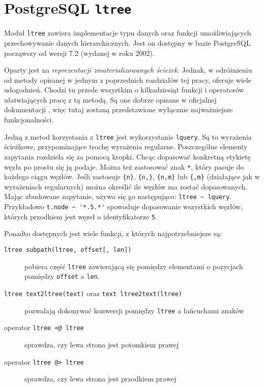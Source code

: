 \section{PostgreSQL \texttt{ltree}}



Moduł \texttt{ltree} zawiera implementacje typu danych oraz funkcji umożliwiających przechowywanie danych hierarchicznych.
Jest on dostępny w bazie PostgreSQL począwszy od wersji 7.2 (wydanej w roku 2002).

Oparty jest na \emph{reprezentacji zmaterializowanych ścieżek}.
Jednak, w odróżnieniu od metody opisanej w jednym z poprzednich rozdziałów tej pracy, oferuje wiele udogodnień.
Chodzi tu przede wszystkim o kilkadziesiąt funkcji i operatorów ułatwiających pracę z tą metodą.
Są one dobrze opisane w oficjalnej dokumentacji \cite{ltree}, 
więc tutaj zostaną przedstawione wyłącznie najważniejsze funkcjonalności.


Jedną z metod korzystania z \texttt{ltree} jest wykorzystanie \texttt{lquery}.
Są to wyrażenia ścieżkowe, przypominające trochę wyrażenia regularne.
Poszczególne elementy zapytania rozdziela się za pomocą kropki.
Chcąc dopasować konkretną etykietę węzła po prostu się ją podaje.
Można też zastosować znak \verb|*|, który pasuje do każdego ciągu węzłów.
Jeśli zastosuje \texttt{\{n\}}, \texttt{\{n,\}}, \texttt{\{n,m\}} lub \texttt{\{,m\}} 
(działające jak w wyrażeniach regularnych)
można określić ile węzłów ma zostać dopasowanych.
Mając zbudowane zapytanie, używa się go następująco: \verb|ltree ~ lquery|.
Przykładowo \verb|t.node ~ '*.5.*'| spowoduje dopasowanie wszystkich węzłów, 
których przodkiem jest węzeł o identyfikatorze \texttt{5}.


Ponadto dostępnych jest wiele funkcji, z których najpotrzebniejsze są:

\begin{description}
    \item[\texttt{ltree subpath(ltree, offset[, len])}]
    	pobiera część \texttt{ltree} zawierającą się pomiędzy elementami o pozycjach pomiędzy 
    	\texttt{offset} a \texttt{len}. 
    \item[\texttt{ltree text2ltree(text)} oraz \texttt{text ltree2text(ltree)}] 
    	pozwalają dokonywać konwersji pomiędzy \texttt{ltree} a łańcuchami znaków
    \item[operator \texttt{ltree <@ ltree}] sprawdza, czy lewa strona jest potomkiem prawej
    \item[operator \texttt{ltree @> ltree}] sprawdza, czy lewa strona jest przodkiem prawej
\end{description}


